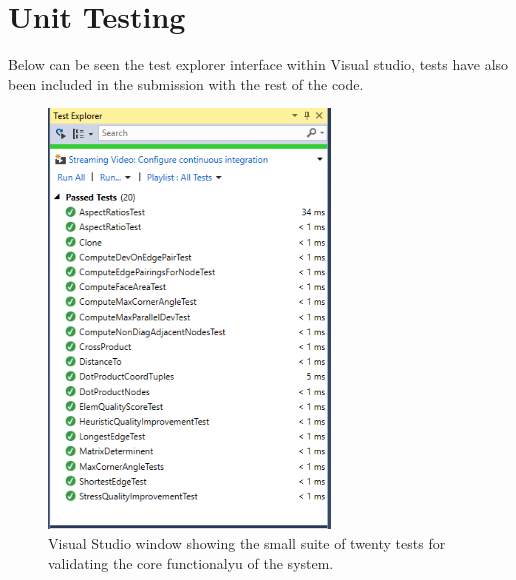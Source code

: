 




\newpage
\section{Unit Testing}
Below can be seen the test explorer interface within Visual studio, tests have also been included in the submission with the rest of the code.

\begin{figure}[H]
  \centerline{\includegraphics[width=75mm, scale=0.5]{../Graphics/unitTests.png}}
  \caption{Visual Studio window showing the small suite of twenty tests for validating the core functionalyu of the system.}
\end{figure}

